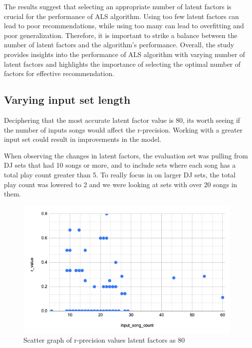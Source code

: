 The results suggest that selecting an appropriate number of latent factors is crucial for the performance of ALS algorithm. Using too few latent factors can lead to poor recommendations, while using too many can lead to overfitting and poor generalization. Therefore, it is important to strike a balance between the number of latent factors and the algorithm's performance. Overall, the study provides insights into the performance of ALS algorithm with varying number of latent factors and highlights the importance of selecting the optimal number of factors for effective recommendation.

\subsection{Varying input set length}
Deciphering that the most accurate latent factor value is 80, its worth seeing if the number of inputs songs would affect the r-precision. Working with a greater input set could result in improvements in the model. 

When observing the changes in latent factors, the evaluation set was pulling from DJ sets that had 10 songs or more, and to include sets where each song has a total play count greater than 5. To really focus in on larger DJ sets, the total play count was lowered to 2 and we were looking at sets with over 20 songs in them.

\begin{figure}[H]
	\includegraphics[scale=0.6]{images/80_little_sets}
	\centering
	\caption{Scatter graph of r-precision values latent factors as 80} 
\end{figure}

